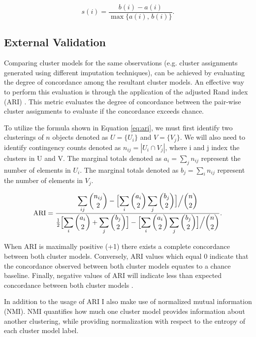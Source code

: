 \begin{equation}\label{eq:silhouette}
s(i)=\frac{b(i)-a(i)}{\max\{a(i),\,b(i)\}}.
\end{equation}

\subsection{External Validation}
Comparing cluster models for the same observations (e.g. cluster assignments generated using different imputation techniques), can be achieved by evaluating the degree of concordance among the resultant cluster models. An effective way to perform this evaluation is through the application of the adjusted Rand index (ARI) \parencite{hubert1985comparing}. This metric evaluates the degree of concordance between the pair-wise cluster assignments to evaluate if the concordance exceeds chance.

To utilize the formula shown in Equation \ref{eq:ari}, we must first identify two clusterings of \(n\) objects denoted as $U = \{U_i\}$ and $V = \{V_j\}$. We will also need to identify contingency counts denoted as $n_{ij} = |U_i \cap V_j|$, where i and j index the clusters in U and V. The marginal totals denoted as $a_i = \sum_j n_{ij}$ represent the number of elements in \(U_i\). The marginal totals denoted as $b_j = \sum_i n_{ij}$ represent the number of elements in \(V_j\).

\begin{equation}\label{eq:ari}
\mathrm{ARI}=\frac{\displaystyle\sum_{ij}\binom{n_{ij}}{2}-\Bigl[\sum_i\binom{a_i}{2}\sum_j\binom{b_j}{2}\Bigr]\Big/\binom{n}{2}}{\displaystyle\tfrac12\Bigl[\sum_i\binom{a_i}{2}+\sum_j\binom{b_j}{2}\Bigr]-\Bigl[\sum_i\binom{a_i}{2}\sum_j\binom{b_j}{2}\Bigr]\Big/\binom{n}{2}}.
\end{equation}

When ARI is maximally positive (+1) there exists a complete concordance between both cluster models. Conversely, ARI values which equal 0 indicate that the concordance observed between both cluster models equates to a chance baseline. Finally, negative values of ARI will indicate less than expected concordance between both cluster models \parencite{robert2020comparing}.

In addition to the usage of ARI I also make use of normalized mutual information (NMI). NMI quantifies how much one cluster model provides information about another clustering, while providing normalization with respect to the entropy of each cluster model label.

